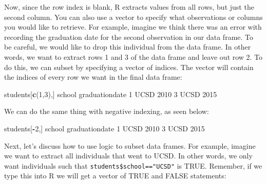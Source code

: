 \documentclass[
]{book}
\newenvironment{Shaded}{\begin{snugshade}}{\end{snugshade}}
\newcommand{\ConstantTok}[1]{\textcolor[rgb]{0.56,0.35,0.01}{#1}}
\newcommand{\DecValTok}[1]{\textcolor[rgb]{0.00,0.00,0.81}{#1}}
\newcommand{\FunctionTok}[1]{\textcolor[rgb]{0.13,0.29,0.53}{\textbf{#1}}}
\newcommand{\NormalTok}[1]{#1}
\newcommand{\SpecialCharTok}[1]{\textcolor[rgb]{0.81,0.36,0.00}{\textbf{#1}}}
\newcommand{\StringTok}[1]{\textcolor[rgb]{0.31,0.60,0.02}{#1}}
\begin{document}
Now, since the row index is blank, R extracts values from all rows, but just the second column.
You can also use a vector to specify what observations or columns you would like to retrieve. For example, imagine we think there was an error with recording the graduation date for the second observation in our data frame. To be careful, we would like to drop this individual from the data frame. In other words, we want to extract rows 1 and 3 of the data frame and leave out row 2. To do this, we can subset by specifying a vector of indices. The vector will contain the indices of every row we want in the final data frame:

\begin{Shaded}
\begin{Highlighting}[]
\NormalTok{students[}\FunctionTok{c}\NormalTok{(}\DecValTok{1}\NormalTok{,}\DecValTok{3}\NormalTok{),]}
\NormalTok{  school graduationdate}
\DecValTok{1}\NormalTok{   UCSD           }\DecValTok{2010}
\DecValTok{3}\NormalTok{   UCSD           }\DecValTok{2015}
\end{Highlighting}
\end{Shaded}

We can do the same thing with negative indexing, as seen below:

\begin{Shaded}
\begin{Highlighting}[]
\NormalTok{students[}\SpecialCharTok{{-}}\DecValTok{2}\NormalTok{,]}
\NormalTok{  school graduationdate}
\DecValTok{1}\NormalTok{   UCSD           }\DecValTok{2010}
\DecValTok{3}\NormalTok{   UCSD           }\DecValTok{2015}
\end{Highlighting}
\end{Shaded}

Next, let's discuss how to use logic to subset data frames. For example, imagine we want to extract all individuals that went to UCSD. In other words, we only want individuals such that \texttt{students\$school=="UCSD"} is TRUE. Remember, if we type this into R we will get a vector of TRUE and FALSE statements:

\begin{Shaded}
\end{Shaded}
\end{document}

